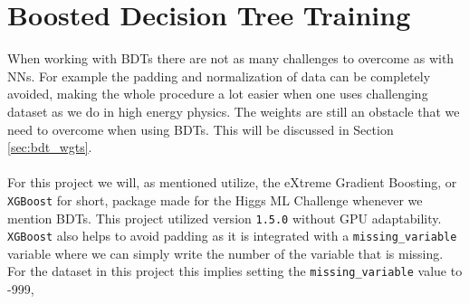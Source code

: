 \documentclass[12pt, a4paper]{book}
\begin{document}
\section{Boosted Decision Tree Training}
When working with BDTs there are not as many challenges to overcome as with NNs. For example the padding and normalization of data can be completely avoided, making the whole procedure a lot easier when one uses challenging dataset as we do in high energy physics.
The weights are still an obstacle that we need to overcome when using BDTs. This will be discussed in Section \ref{sec:bdt_wgts}.\\
\\For this project we will, as mentioned utilize, the eXtreme Gradient Boosting, or \verb|XGBoost| for short, package \cite{XGBoost} made for the Higgs ML Challenge \cite{HiggsChallenge} whenever we mention BDTs.
This project utilized version \verb|1.5.0| without GPU adaptability. \verb|XGBoost| also helps to avoid padding as it is integrated with a \verb|missing_variable| variable where we can simply write the number of the variable that is missing. For the dataset in this project this implies setting the \verb|missing_variable| value to -999, 
\end{document}
